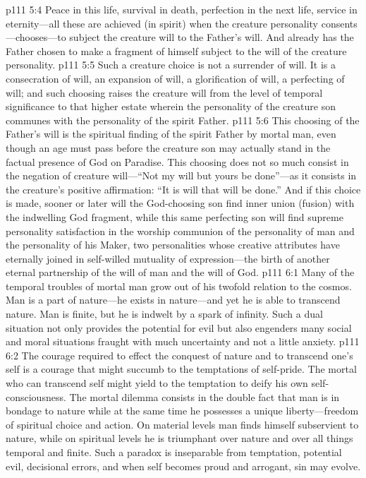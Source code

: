\vs p111 5:4 Peace in this life, survival in death, perfection in the next life, service in eternity---all these are achieved (in spirit)  when the creature personality consents---chooses---to subject the creature will to the Father’s will. And already has the Father chosen to make a fragment of himself subject to the will of the creature personality.
\vs p111 5:5 Such a creature choice is not a surrender of will. It is a consecration of will, an expansion of will, a glorification of will, a perfecting of will; and such choosing raises the creature will from the level of temporal significance to that higher estate wherein the personality of the creature son communes with the personality of the spirit Father.
\vs p111 5:6 This choosing of the Father’s will is the spiritual finding of the spirit Father by mortal man, even though an age must pass before the creature son may actually stand in the factual presence of God on Paradise. This choosing does not so much consist in the negation of creature will---“Not my will but yours be done”---as it consists in the creature’s positive affirmation: “It is  will that  will be done.” And if this choice is made, sooner or later will the God\hyp{}choosing son find inner union (fusion) with the indwelling God fragment, while this same perfecting son will find supreme personality satisfaction in the worship communion of the personality of man and the personality of his Maker, two personalities whose creative attributes have eternally joined in self\hyp{}willed mutuality of expression---the birth of another eternal partnership of the will of man and the will of God.\plusone
{}
\vs p111 6:1 Many of the temporal troubles of mortal man grow out of his twofold relation to the cosmos. Man is a part of nature---he exists in nature---and yet he is able to transcend nature. Man is finite, but he is indwelt by a spark of infinity. Such a dual situation not only provides the potential for evil but also engenders many social and moral situations fraught with much uncertainty and not a little anxiety.
\vs p111 6:2 The courage required to effect the conquest of nature and to transcend one’s self is a courage that might succumb to the temptations of self\hyp{}pride. The mortal who can transcend self might yield to the temptation to deify his own self\hyp{}consciousness. The mortal dilemma consists in the double fact that man is in bondage to nature while at the same time he possesses a unique liberty---freedom of spiritual choice and action. On material levels man finds himself subservient to nature, while on spiritual levels he is triumphant over nature and over all things temporal and finite. Such a paradox is inseparable from temptation, potential evil, decisional errors, and when self becomes proud and arrogant, sin may evolve.
